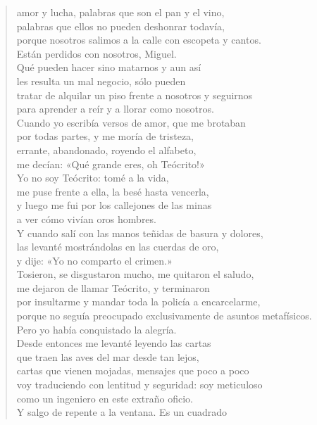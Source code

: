 \documentclass[12pt]{article}
\begin{document}
\begin{verse}
amor y lucha, palabras que son el pan y el vino,\\
palabras que ellos no pueden deshonrar todavía,\\
porque nosotros salimos a la calle con escopeta y cantos.\\
Están perdidos con nosotros, Miguel.\\
Qué pueden hacer sino matarnos y aun así\\
les resulta un mal negocio, sólo pueden\\
tratar de alquilar un piso frente a nosotros y seguirnos\\
para aprender a reír y a llorar como nosotros.\\
Cuando yo escribía versos de amor, que me brotaban\\
por todas partes, y me moría de tristeza,\\
errante, abandonado, royendo el alfabeto,\\
me decían: «Qué grande eres, oh Teócrito!»\\
Yo no soy Teócrito: tomé a la vida,\\
me puse frente a ella, la besé hasta vencerla,\\
y luego me fui por los callejones de las minas\\
a ver cómo vivían oros hombres.\\
Y cuando salí con las manos teñidas de basura y dolores,\\
las levanté mostrándolas en las cuerdas de oro,\\
y dije: «Yo no comparto el crimen.»\\
Tosieron, se disgustaron mucho, me quitaron el saludo,\\
me dejaron de llamar Teócrito, y terminaron\\
por insultarme y mandar toda la policía a encarcelarme,\\
porque no seguía preocupado exclusivamente de asuntos metafísicos.\\
Pero yo había conquistado la alegría.\\
Desde entonces me levanté leyendo las cartas\\
que traen las aves del mar desde tan lejos,\\
cartas que vienen mojadas, mensajes que poco a poco\\
voy traduciendo con lentitud y seguridad: soy meticuloso\\
como un ingeniero en este extraño oficio.\\
Y salgo de repente a la ventana. Es un cuadrado\\

\end{verse}
\end{document}
